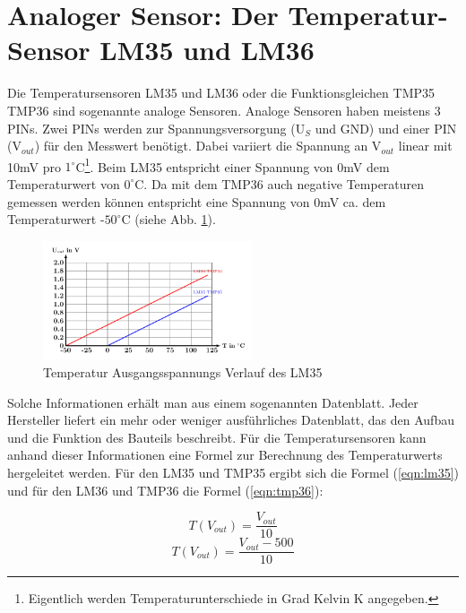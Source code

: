
\section{Analoger Sensor: Der Temperatur-Sensor LM35 und LM36}
\label{sec:lm35}
Die Temperatursensoren LM35 und LM36 oder die Funktionsgleichen TMP35 TMP36 sind sogenannte analoge Sensoren. Analoge Sensoren haben meistens 3 PINs. Zwei PINs werden zur Spannungsversorgung (U$_S$ und GND) und einer PIN (V$_{out}$) für den Messwert benötigt. Dabei variiert die Spannung an V$_{out}$ linear mit 10mV pro $1^\circ$C\footnote{Eigentlich werden Temperaturunterschiede in Grad Kelvin K angegeben.}. Beim LM35 entspricht einer Spannung von 0mV dem Temperaturwert von $0^\circ$C. Da mit dem TMP36 auch negative Temperaturen gemessen werden können entspricht eine Spannung von 0mV ca. dem Temperaturwert -$50^\circ$C (siehe Abb. \ref{fig:daten-tmp36}). 
\begin{figure}[h]
  \begin{center}
  \includegraphics[width=0.55\textwidth]{Kapitel2/Tikz/lm35temp.pdf}
  \caption{Temperatur Ausgangsspannungs Verlauf des LM35}
  \label{fig:daten-tmp36}
  \end{center}
\end{figure}


Solche Informationen erhält man aus einem sogenannten Datenblatt. Jeder Hersteller liefert ein mehr oder weniger ausführliches Datenblatt, das den Aufbau und die Funktion des Bauteils beschreibt. 
Für die Temperatursensoren kann anhand dieser Informationen eine Formel zur Berechnung des Temperaturwerts hergeleitet werden. Für den LM35 und TMP35 ergibt sich die Formel (\ref{eqn:lm35}) und für den LM36 und TMP36 die Formel (\ref{eqn:tmp36}):
\begin{multicols}{2}
\begin{equation}\label{eqn:lm35}
 T(V_{out}) = \frac{V_{out}}{10}
\end{equation}
\begin{equation}\label{eqn:tmp36}
 T(V_{out}) = \frac{V_{out} - 500}{10}
\end{equation}
\end{multicols}

